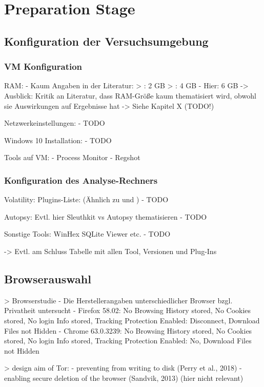 \section{Preparation Stage}

\subsection{Konfiguration der Versuchsumgebung}

\subsubsection*{VM Konfiguration}
RAM:
	- Kaum Angaben in der Literatur:
		> \cite{Rochmadi.2017}: 2 GB 
		> \cite{Ohana.2013}: 4 GB
	- Hier: 6 GB 
	-> Ausblick: Kritik an Literatur, dass RAM-Größe kaum thematisiert wird, obwohl sie Auswirkungen auf Ergebnisse hat -> Siehe Kapitel X (TODO!)

Netzwerkeinstellungen: 
	- TODO

Windows 10 Installation:
	- TODO

Tools auf VM:
	- Process Monitor
	- Regshot

\subsubsection*{Konfiguration des Analyse-Rechners}

Volatility:
	Plugins-Liste: (Ähnlich zu \cite{Hariharan} und \cite{Dayalamurthy.2013})
		- TODO
	
Autopsy:
	Evtl. hier Sleuthkit vs Autopsy thematisieren
		- TODO

Sonstige Tools:
	WinHex SQLite Viewer etc.
		- TODO

-> Evtl. am Schluss Tabelle mit allen Tool, Versionen und Plug-Ins

\subsection{Browserauswahl}

> Browserstudie \cite{Izzati.2022}
- Die Herstellerangaben unterschiedlicher Browser bzgl. Privatheit untersucht
- Firefox 58.02: No Browsing History stored, No Cookies stored, No login Info stored, Tracking Protection Enabled: Disconnect, Download Files not Hidden
- Chrome 63.0.3239: No Browsing History stored, No Cookies stored, No login Info stored, Tracking Protection Enabled: No, Download Files not Hidden

> design aim of Tor: \cite{Muir.2019}
- preventing from writing to disk (Perry et al., 2018) 
- enabling secure deletion of the browser (Sandvik, 2013) (hier nicht relevant)


